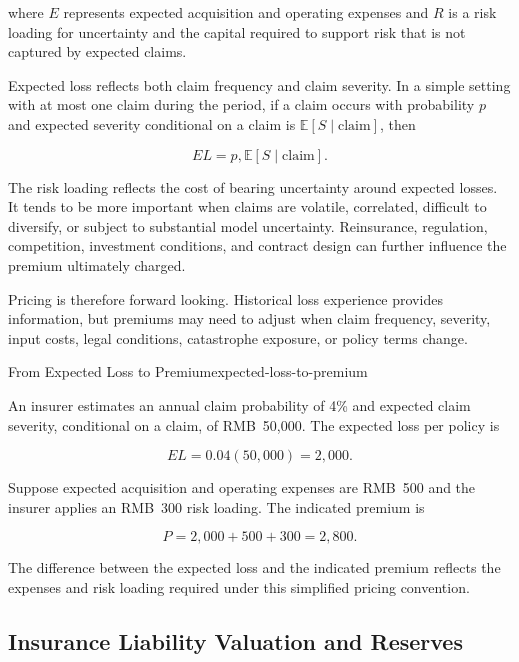 where $E$ represents expected acquisition and operating expenses and $R$ is a risk loading for uncertainty and the capital required to support risk that is not captured by expected claims.

Expected loss reflects both claim frequency and claim severity. In a simple setting with at most one claim during the period, if a claim occurs with probability $p$ and expected severity conditional on a claim is $\mathbb{E}[S\mid \text{claim}]$, then

\begin{equation}
EL=
p,\mathbb{E}[S\mid \text{claim}].
\label{eq:ch15-frequency-severity}
\end{equation}

The risk loading reflects the cost of bearing uncertainty around expected losses. It tends to be more important when claims are volatile, correlated, difficult to diversify, or subject to substantial model uncertainty. Reinsurance, regulation, competition, investment conditions, and contract design can further influence the premium ultimately charged.

Pricing is therefore forward looking. Historical loss experience provides information, but premiums may need to adjust when claim frequency, severity, input costs, legal conditions, catastrophe exposure, or policy terms change.

\begin{example}{From Expected Loss to Premium}{expected-loss-to-premium}

An insurer estimates an annual claim probability of 4\% and expected claim severity, conditional on a claim, of RMB~50,000. The expected loss per policy is

$$
EL=0.04(50{,}000)=2{,}000.
$$

Suppose expected acquisition and operating expenses are RMB~500 and the insurer applies an RMB~300 risk loading. The indicated premium is

$$
P=2{,}000+500+300=2{,}800.
$$

The difference between the expected loss and the indicated premium reflects the expenses and risk loading required under this simplified pricing convention.

\end{example}


\subsection{Insurance Liability Valuation and Reserves}

